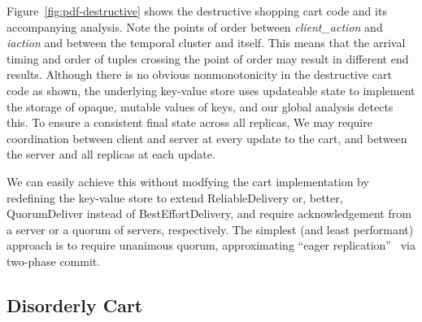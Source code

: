 Figure~\ref{fig:pdf-destructive} shows the destructive shopping cart code
and its accompanying analysis.  Note the points of order between \emph{client\_action} and \emph{iaction}
and between the temporal cluster and itself.  This means that the arrival 
timing and order of tuples crossing the point of order may result in different
end results.  Although there is no obvious nonmonotonicity in the destructive
cart code as shown, the underlying key-value store uses updateable state
to implement the storage of opaque, mutable values of keys, and our global
analysis detects this.
To ensure a consistent final state across all replicas, We may require coordination
between client and server at every update to the cart, and between the 
server and all replicas at each update.  

We can easily achieve this without modfying the cart implementation
by redefining the key-value store to extend
ReliableDelivery or, better, QuorumDeliver instead of BestEffortDelivery, and require acknowledgement from a server or a quorum of servers, respectively.
The simplest (and least performant) approach is to require unanimous quorum,
approximating ``eager replication''~\cite{dangers} via two-phase commit.


\subsection{Disorderly Cart}

